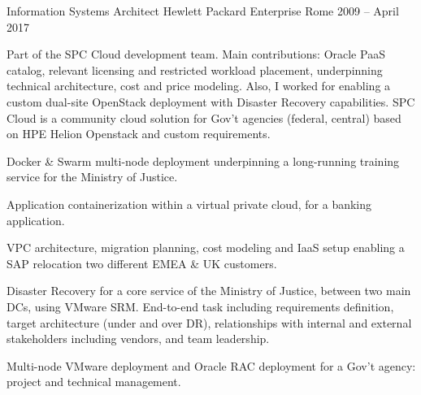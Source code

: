 \begin{cventries}
  \cventry
    {Information Systems Architect} %
    {Hewlett Packard Enterprise} %
    {Rome} %
    {2009 -- April 2017} %
    {
      \begin{cvitems} %
        \item {Part of the SPC Cloud development team. Main contributions: Oracle PaaS catalog, relevant licensing and restricted workload placement, underpinning technical architecture, cost and price modeling. Also, I worked for enabling a custom dual-site OpenStack deployment with Disaster Recovery capabilities. SPC Cloud is a community cloud solution for Gov't agencies (federal, central) based on HPE Helion Openstack and custom requirements.}
        \item {Docker \& Swarm multi-node deployment underpinning a long-running training service for the Ministry of Justice.}
        \item {Application containerization within a virtual private cloud, for a banking application.}
        \item {VPC architecture, migration planning, cost modeling and IaaS setup enabling a SAP relocation two different EMEA \& UK customers.}
        \item {Disaster Recovery for a core service of the Ministry of Justice, between two main DCs, using VMware SRM. End-to-end task including requirements definition, target architecture (under and over DR), relationships with internal and external stakeholders including vendors, and team leadership.}
        \item {Multi-node VMware deployment and Oracle RAC deployment for a Gov't agency: project and technical management.}
      \end{cvitems}
    }



\end{cventries}
